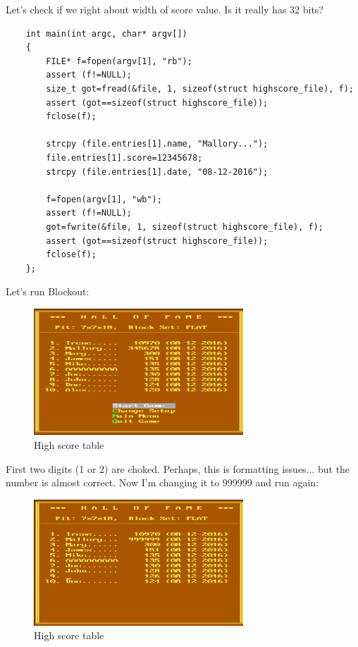 Let's check if we right about width of score value. Is it really has 32 bits?

\begin{lstlisting}
	int main(int argc, char* argv[])
	{
		FILE* f=fopen(argv[1], "rb");
		assert (f!=NULL);
		size_t got=fread(&file, 1, sizeof(struct highscore_file), f);
		assert (got==sizeof(struct highscore_file));
		fclose(f);
	
		strcpy (file.entries[1].name, "Mallory...");
		file.entries[1].score=12345678;
		strcpy (file.entries[1].date, "08-12-2016");
	
		f=fopen(argv[1], "wb");
		assert (f!=NULL);
		got=fwrite(&file, 1, sizeof(struct highscore_file), f);
		assert (got==sizeof(struct highscore_file));
		fclose(f);
	};
\end{lstlisting}

Let's run Blockout:

\begin{figure}[H]
\centering
\includegraphics[width=0.7\textwidth]{advanced/550_more_structs/blockout/hs345678.png}
\caption{High score table}
\end{figure}

First two digits (1 or 2) are choked. Perhaps, this is formatting issues... but the number is almost correct.
Now I'm changing it to 999999 and run again:

\begin{figure}[H]
\centering
\includegraphics[width=0.7\textwidth]{advanced/550_more_structs/blockout/hs999999.png}
\caption{High score table}
\end{figure}

